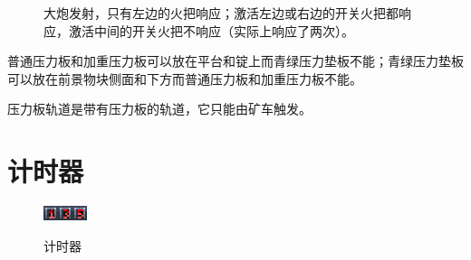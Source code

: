 \begin{figure}[!ht]
\begin{center}
\qquad
{}
\end{center}
\caption{\protect{}大炮发射，只有左边的火把响应；\protect{}激活左边或右边的开关火把都响应，激活中间的开关火把不响应（实际上响应了两次）。}
\label{i209:212}
\end{figure}

普通压力板和加重压力板可以放在平台和锭上而青绿压力垫板不能；青绿压力垫板可以放在前景物块侧面和下方而普通压力板和加重压力板不能。

压力板轨道是带有压力板的轨道，它只能由矿车触发。

\section{计时器}
\begin{figure}[!ht]
\centering
\includegraphics{figures/1_Second_Timer.png}\quad\includegraphics{figures/3_Second_Timer.png}\quad\includegraphics{figures/5_Second_Timer.png}
\caption{计时器}
\end{figure}

